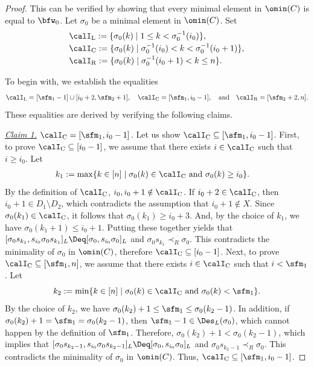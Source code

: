 \documentclass[12pt, reqno]{amsart}
\theoremstyle{definition}
\numberwithin{equation}{section} \numberwithin{figure}{section}
\numberwithin{table}{section}
\begin{document}
\begin{proof}
This can be verified by showing that every minimal element in $\omin(C)$ is equal to $\bfw_0$.
Let $\sigma_0$ be a minimal element in $\omin(C)$. 
Set 
\begin{align*}
\begin{array}{l}
\calI_{\mathrm{L}} := \{\sigma_0(k) \mid 1 \le k < \sigma_0^{-1}(i_0)\}, \\[.5ex]
\calI_{\mathrm{C}} := \{\sigma_0(k) \mid \sigma_0^{-1}(i_0) < k < \sigma_0^{-1}(i_0+1) \}, 
\\[.5ex]
\calI_{\mathrm{R}} := \{\sigma_0(k) \mid \sigma_0^{-1}(i_0 + 1) < k \le n\}.
\end{array}
\end{align*}


To begin with, we establish the equalities
\begin{align}\label{eq: calI_L calI_C calI_R}
\calI_\mathrm{L} = [\sfm_1 -1] \cup [i_0+2, \sfm_2+1], 
\quad
\calI_\mathrm{C} = [\sfm_1, i_0 - 1],
\quad \text{and} \quad
\calI_\mathrm{R} = [\sfm_2 + 2,n].
\end{align}
These equalities are derived by verifying the following claims.
\smallskip

{\it \underline{Claim 1.} $\calI_\mathrm{C} = [\sfm_1, i_0 - 1]$.}
Let us show $\calI_\mathrm{C} \subseteq [\sfm_1, i_0 - 1]$.
First, to prove $\calI_\mathrm{C} \subseteq [i_0 - 1]$, we
assume that there exists $i \in \calI_\mathrm{C}$ such that $i \geq i_0$.
Let
\begin{align*}
k_1 & := \mathrm{max}\{k \in [n] \mid \sigma_0(k) \in \calI_\mathrm{C} \ \text{and} \  \sigma_0(k) \ge i_0 \}.
\end{align*}
By the definition of $\calI_\mathrm{C}$, $i_0,i_0+1 \notin \calI_\mathrm{C}$.
If $i_0 + 2 \in \calI_\mathrm{C}$, then $i_0 + 1 \in D_1 \setminus D_2$, which contradicts the assumption that $i_0 +1 \notin X$.
Since $\sigma_0(k_1) \in \calI_\mathrm{C}$,
it follows that $\sigma_0(k_1) \geq i_0 + 3$.
And, by the choice of $k_1$, we have $\sigma_0(k_1 + 1) \leq i_0+1$.
Putting these together yields that
$[\sigma_0 s_{k_1}, s_{i_0} \sigma_0s_{k_1}]_L \Deq [\sigma_0, s_{i_0}\sigma_0]_L$ and $\sigma_0 s_{k_1} \prec_R \sigma_0$.
This contradicts the minimality of $\sigma_0$ in $\omin(C)$, therefore $\calI_\mathrm{C} \subseteq [i_0 - 1]$.
Next, to prove $\calI_\mathrm{C} \subseteq [\sfm_1, n]$, we assume that there exists $i \in \calI_\mathrm{C}$ such that $i < \sfm_1$.
Let
\[
k_2 := \mathrm{min}\{ 
k \in [n] \mid \sigma_0(k) \in \calI_\mathrm{C} \ \text{and} \ 
\sigma_0(k) < \sfm_1\}.
\]
By the choice of $k_2$, we have $\sigma_0(k_2) + 1 \le \sfm_1 \le \sigma_0(k_2 - 1)$.
In addition, if $\sigma_0(k_2) + 1 = \sfm_1 = \sigma_0(k_2 - 1)$, then $\sfm_1 - 1 \in \Des_L(\sigma_0)$, which cannot happen by the definition of $\sfm_1$.
Therefore, $\sigma_0(k_2) + 1 < \sigma_0(k_2 - 1)$, which implies that $[\sigma_0 s_{k_2 - 1}, s_{i_0} \sigma_0 s_{k_2 - 1}]_L \Deq [\sigma_0, s_{i_0}\sigma_0]_L$ and
$\sigma_0 s_{k_2 - 1} \prec_R \sigma_0$.
This contradicts the minimality of $\sigma_0$ in $\omin(C)$.
Thus, $\calI_\mathrm{C} \subseteq [\sfm_1, i_0 - 1]$.


\end{proof}
\end{document}
